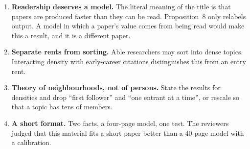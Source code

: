 \begin{enumerate}
\item \textbf{Readership deserves a model.} The literal meaning of the title is that papers are produced faster than they can be read. Proposition~8 only relabels output. A model in which a paper's value comes from being read would make this a result, and it is a different paper.
\item \textbf{Separate rents from sorting.} Able researchers may sort into dense topics. Interacting density with early-career citations distinguishes this from an entry rent.
\item \textbf{Theory of neighbourhoods, not of persons.} State the results for densities and drop ``first follower'' and ``one entrant at a time'', or rescale so that a topic has tens of members.
\item \textbf{A short format.} Two facts, a four-page model, one test. The reviewers judged that this material fits a short paper better than a 40-page model with a calibration.
\end{enumerate}
